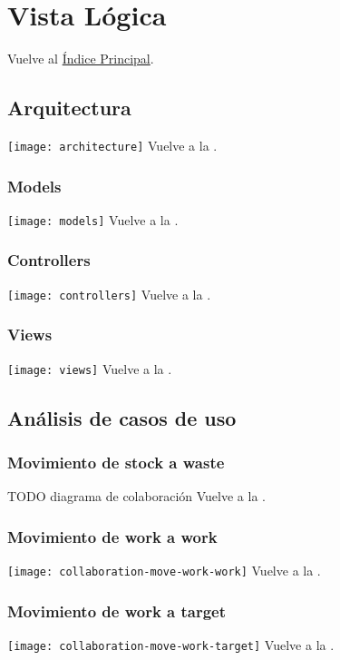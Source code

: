 \newpage{}
\section{Vista Lógica}\label{logictoc}

\secttoc
Vuelve al \hyperlink{toc}{Índice Principal}.

\newpage{}
\subsection{Arquitectura}
\texttt{[image: architecture]}
Vuelve a la .

\newpage{}
\subsubsection{Models}
\texttt{[image: models]}
Vuelve a la .

\newpage{}
\subsubsection{Controllers}
\texttt{[image: controllers]}
Vuelve a la .

\newpage{}
\subsubsection{Views}
\texttt{[image: views]}
Vuelve a la .

\newpage{}
\subsection{Análisis de casos de uso}

\subsubsection{Movimiento de stock a waste}
TODO diagrama de colaboración
Vuelve a la .

\newpage{}
\subsubsection{Movimiento de work a work}
\texttt{[image: collaboration-move-work-work]}
Vuelve a la .

\newpage{}
\subsubsection{Movimiento de work a target}
\texttt{[image: collaboration-move-work-target]}
Vuelve a la .


